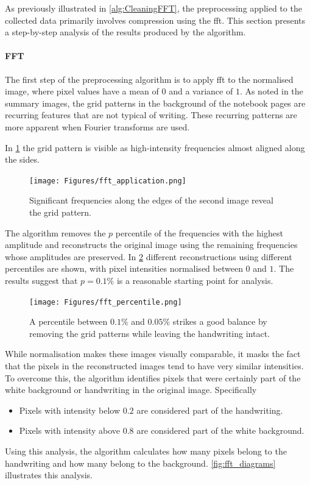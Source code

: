 \begin{toReview}
	\noindent As previously illustrated in \cref{alg:CleaningFFT}, the preprocessing applied to the collected data primarily involves compression using the \gls{fft}. This section presents a step-by-step analysis of the results produced by the algorithm.

    \paragraph{FFT}
    The first step of the preprocessing algorithm is to apply \gls{fft} to the normalised image, where pixel values have a mean of $0$ and a variance of $1$. As noted in the summary images, the grid patterns in the background of the notebook pages are recurring features that are not typical of writing. These recurring patterns are more apparent when Fourier transforms are used.

    \noindent In \cref{fig:fft_application} the grid pattern is visible as high-intensity frequencies almost aligned along the sides.

    \begin{figure}[H]
    	\centering \texttt{[image: Figures/fft\_application.png]}\caption[FFT application in pre-processing]{Significant frequencies along the edges of the second image reveal the grid pattern.}\label{fig:fft_application}
    \end{figure}

	\noindent The algorithm removes the $p$ percentile of the frequencies with the highest amplitude and reconstructs the original image using the remaining frequencies whose amplitudes are preserved. In \cref{fig:fft_percentile} different reconstructions using different percentiles are shown, with pixel intensities normalised between $0$ and $1$. The results suggest that $p=0.1\%$ is a reasonable starting point for analysis.

	\begin{figure}[H]
		\centering \texttt{[image: Figures/fft\_percentile.png]}\caption[Comparing different percentiles in FFT]{A percentile between $0.1\%$ and $0.05\%$ strikes a good balance by removing the grid patterns while leaving the handwriting intact.}
		\label{fig:fft_percentile}
	\end{figure}

	\noindent While normalisation makes these images visually comparable, it masks the fact that the pixels in the reconstructed images tend to have very similar intensities. To overcome this, the algorithm identifies pixels that were certainly part of the white background or handwriting in the original image. Specifically
	\begin{itemize}
		\item Pixels with intensity below $0.2$ are considered part of the handwriting.
		\item Pixels with intensity above $0.8$ are considered part of the white background.
	\end{itemize}
	\noindent Using this analysis, the algorithm calculates how many pixels belong to the handwriting and how many belong to the background. \cref{fig:fft_diagrams} illustrates this analysis.


\end{toReview}
